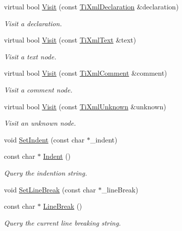 \begin{DoxyCompactItemize}
virtual bool \hyperlink{class_ti_xml_printer_adaf7eec4dc43ad071ff52b60361574f5}{Visit} (const \hyperlink{class_ti_xml_declaration}{Ti\+Xml\+Declaration} \&declaration)
\begin{DoxyCompactList}\small\item\em Visit a declaration. \end{DoxyCompactList}\item 
virtual bool \hyperlink{class_ti_xml_printer_a0857c5d32c59b9a257f9a49cb9411df5}{Visit} (const \hyperlink{class_ti_xml_text}{Ti\+Xml\+Text} \&text)
\begin{DoxyCompactList}\small\item\em Visit a text node. \end{DoxyCompactList}\item 
virtual bool \hyperlink{class_ti_xml_printer_a9870423f5603630e6142f6bdb66dfb57}{Visit} (const \hyperlink{class_ti_xml_comment}{Ti\+Xml\+Comment} \&comment)
\begin{DoxyCompactList}\small\item\em Visit a comment node. \end{DoxyCompactList}\item 
virtual bool \hyperlink{class_ti_xml_printer_a08591a15c9a07afa83c24e08b03d6358}{Visit} (const \hyperlink{class_ti_xml_unknown}{Ti\+Xml\+Unknown} \&unknown)
\begin{DoxyCompactList}\small\item\em Visit an unknown node. \end{DoxyCompactList}\item 
void \hyperlink{class_ti_xml_printer_a213377a4070c7e625bae59716b089e5e}{Set\+Indent} (const char $\ast$\+\_\+indent)
\item 
const char $\ast$ \hyperlink{class_ti_xml_printer_abb33ec7d4bad6aaeb57f4304394b133d}{Indent} ()
\begin{DoxyCompactList}\small\item\em Query the indention string. \end{DoxyCompactList}\item 
void \hyperlink{class_ti_xml_printer_a4be1e37e69e3858c59635aa947174fe6}{Set\+Line\+Break} (const char $\ast$\+\_\+line\+Break)
\item 
const char $\ast$ \hyperlink{class_ti_xml_printer_a11f1b4804a460b175ec244eb5724d96d}{Line\+Break} ()
\begin{DoxyCompactList}\small\item\em Query the current line breaking string. \end{DoxyCompactList}\item 

\end{DoxyCompactItemize}
